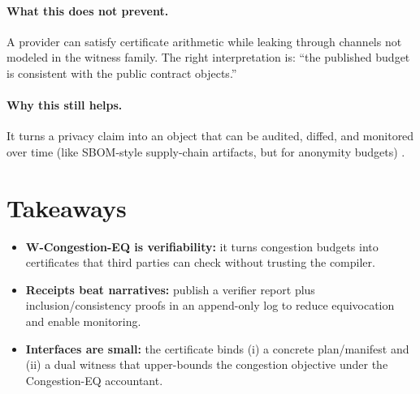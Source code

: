 \documentclass[11pt]{article}
\begin{document}
\paragraph{What this does not prevent.}
A provider can satisfy certificate arithmetic while leaking through channels not modeled in the witness family.
The right interpretation is: ``the published budget is consistent with the public contract objects.''
\paragraph{Why this still helps.}
It turns a privacy claim into an object that can be audited, diffed, and monitored over time (like SBOM-style supply-chain artifacts, but for anonymity budgets) \cite{torresarias_intoto_sec19,sigstore_acm2022,slsa_v1}.

\section{Takeaways}
\begin{itemize}[leftmargin=*]
\item \textbf{W-Congestion-EQ is verifiability:} it turns congestion budgets into certificates that third parties can check without trusting the compiler.
\item \textbf{Receipts beat narratives:} publish a verifier report plus inclusion/consistency proofs in an append-only log to reduce equivocation and enable monitoring.
\item \textbf{Interfaces are small:} the certificate binds (i) a concrete plan/manifest and (ii) a dual witness that upper-bounds the congestion objective under the Congestion-EQ accountant.
\end{itemize}
\end{document}
